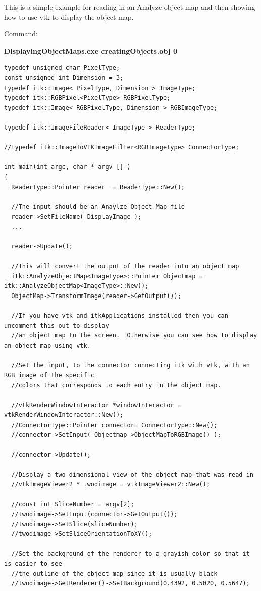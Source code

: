 \documentclass{InsightArticle}
\begin{document}
\begin{itemize}
This is a simple example for reading in an Analyze object map and
then showing how to use vtk to display the object map. 


Command:

\textbf{DisplayingObjectMaps.exe creatingObjects.obj 0}

\small \begin{verbatim}
typedef unsigned char PixelType;
const unsigned int Dimension = 3;
typedef itk::Image< PixelType, Dimension > ImageType;
typedef itk::RGBPixel<PixelType> RGBPixelType;
typedef itk::Image< RGBPixelType, Dimension > RGBImageType;

typedef itk::ImageFileReader< ImageType > ReaderType;

//typedef itk::ImageToVTKImageFilter<RGBImageType> ConnectorType;

int main(int argc, char * argv [] )
{
  ReaderType::Pointer reader  = ReaderType::New();
  
  //The input should be an Anaylze Object Map file
  reader->SetFileName( DisplayImage );
  ...
  
  reader->Update();
          
  //This will convert the output of the reader into an object map
  itk::AnalyzeObjectMap<ImageType>::Pointer Objectmap = itk::AnalyzeObjectMap<ImageType>::New();
  ObjectMap->TransformImage(reader->GetOutput());
  
  //If you have vtk and itkApplications installed then you can uncomment this out to display
  //an object map to the screen.  Otherwise you can see how to display an object map using vtk.
  
  //Set the input, to the connector connecting itk with vtk, with an RGB image of the specific
  //colors that corresponds to each entry in the object map.
  
  //vtkRenderWindowInteractor *windowInteractor = vtkRenderWindowInteractor::New();
  //ConnectorType::Pointer connector= ConnectorType::New();
  //connector->SetInput( Objectmap->ObjectMapToRGBImage() );
  
  //connector->Update();
  
  //Display a two dimensional view of the object map that was read in
  //vtkImageViewer2 * twodimage = vtkImageViewer2::New();
  
  //const int SliceNumber = argv[2];
  //twodimage->SetInput(connector->GetOutput());
  //twodimage->SetSlice(sliceNumber);
  //twodimage->SetSliceOrientationToXY();
  
  //Set the background of the renderer to a grayish color so that it is easier to see
  //the outline of the object map since it is usually black
  //twodimage->GetRenderer()->SetBackground(0.4392, 0.5020, 0.5647);
  

\end{verbatim}
\end{itemize}
\end{document}
